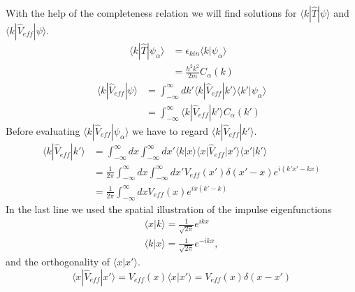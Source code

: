 		With the help of the completeness relation we will find solutions for $\langle k | \hat T | \psi \rangle$ and $ \langle k | \hat V_{eff} | \psi \rangle $. 
		\begin{equation}
			\begin{split}
				\langle k | \hat T | \psi_\alpha \rangle &= \epsilon_{kin} \langle k | \psi_\alpha \rangle \\
				&= \frac{\hbar^2 k^2}{2 m} C_\alpha(k)
			\end{split}
		\end{equation}
		\begin{equation}
			\begin{split}
				\langle k | \hat V_{eff} | \psi \rangle &= \int_{-\infty}^{\infty} dk' \langle k | \hat V_{eff} | k' \rangle \langle k' | \psi_\alpha \rangle \\
				&= \int_{-\infty}^{\infty} \langle k | \hat V_{eff} | k' \rangle C_\alpha(k')
			\end{split}
		\end{equation}
		Before evaluating $\langle k | \hat V_{eff} | \psi_\alpha \rangle$ we have to regard $\langle k | \hat V_{eff} | k' \rangle$.
		\begin{equation}
			\begin{split}
				\label{eq:kVk'}
				\langle k | \hat V_{eff} | k' \rangle &= \int_{-\infty}^{\infty} dx \int_{-\infty}^{\infty} dx' \langle k | x \rangle \langle x | \hat V_{eff} | x' \rangle \langle x' | k' \rangle \\
				&= \frac{1}{2\pi} \int_{-\infty}^{\infty} dx \int_{-\infty}^{\infty} dx' V_{eff}(x')\delta(x'-x) e^{i(k'x'-kx)} \\
				&= \frac{1}{2\pi}\int_{-\infty}^{\infty} dx V_{eff}(x) e^{ix(k'-k)}
			\end{split}
		\end{equation}
		In the last line we used the spatial illustration of the impulse eigenfunctions 
		\begin{equation}
			\begin{split}
				\label{eq:impulsTransformation}
				\langle x | k \rangle = \frac{1}{\sqrt{2 \pi}} e^{ikx} \\
				\langle k | x \rangle = \frac{1}{\sqrt{2 \pi}} e^{-ikx},
			\end{split}
		\end{equation}	
		and the orthogonality of $\langle x | x' \rangle$.
		\begin{equation}
			\langle x | \hat V_{eff} | x' \rangle = V_{eff}(x) \langle x | x' \rangle = V_{eff}(x) \delta(x-x')
		\end{equation}
